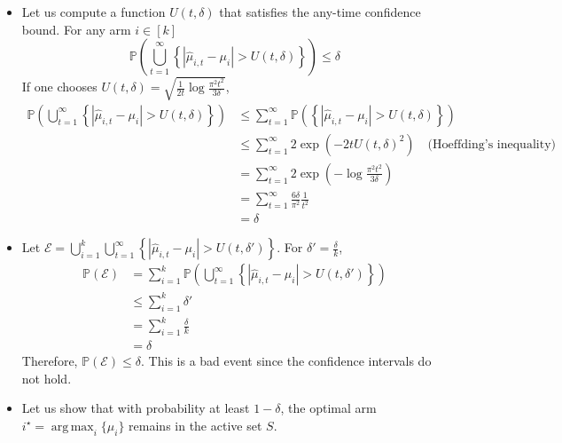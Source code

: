 \documentclass[a4paper]{article}
\newcommand{\wh}[1]{\widehat{#1}}
\DeclareMathOperator*{\argmax}{\arg\,\max}
\begin{document}
\begin{itemize}
	\item Let us compute a function $U(t,\delta)$ that satisfies the any-time confidence bound. For any arm $i \in [k]$
	\[
		\mathbb{P}\left(\bigcup_{t=1}^{\infty} \left\{ | \wh{\mu}_{i,t} - \mu_i | > U(t,\delta)\right\} \right) \leq \delta
	\]
	If one chooses $\boxed{U(t,\delta) = \sqrt{\frac{1}{2t} \log \frac{\pi^2 t^2}{3\delta} }}$,
	\begin{align*}
		\mathbb{P}\left(\bigcup_{t=1}^{\infty} \left\{ | \wh{\mu}_{i,t} - \mu_i | > U(t,\delta)\right\} \right)
		& \leq \sum_{t=1}^\infty \mathbb{P}\left( \left\{ | \wh{\mu}_{i,t} - \mu_i | > U(t,\delta)\right\} \right) \\
		& \leq \sum_{t=1}^\infty 2\exp(-2tU(t, \delta)^2) \quad \text{(Hoeffding's inequality)} \\
		& = \sum_{t=1}^\infty 2\exp\left(-\log \frac{\pi^2 t^2}{3\delta}\right) \\
		& = \sum_{t=1}^\infty \frac{6\delta}{\pi^2}\frac{1}{t^2} \\
		& = \delta
	\end{align*}
	
	\item Let $\mathcal{E} = \bigcup_{i=1}^{k}\bigcup_{t=1}^{\infty} \left\{ | \wh{\mu}_{i,t} - \mu_i | > U(t,\delta')\right\}$. For $\boxed{\delta' = \frac{\delta}{k}}$,
	\begin{align*}
		\mathbb{P}\left(\mathcal{E} \right)
		& = \sum_{i=1}^k \mathbb{P}\left(\bigcup_{t=1}^{\infty} \left\{ | \wh{\mu}_{i,t} - \mu_i | > U(t,\delta')\right\} \right) \\
		& \leq \sum_{i=1}^k \delta' \\
		& = \sum_{i=1}^k \frac{\delta}{k} \\
		& = \delta
	\end{align*}
	Therefore, $\mathbb{P}\left(\mathcal{E} \right) \leq \delta$. This is a bad event since the confidence intervals do not hold.
	
	\item Let us show that with probability at least $1-\delta$, the optimal arm $i^\star =\argmax_i \{\mu_{i}\}$ remains in the active set $S$.
	

\end{itemize}
\end{document}
